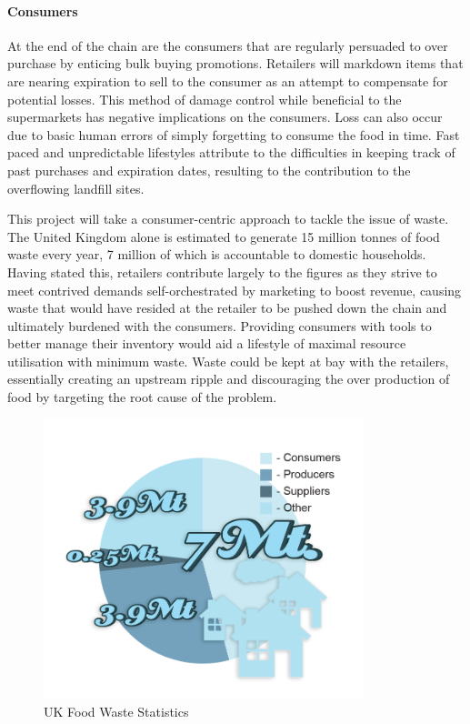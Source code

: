 \documentclass[a4paper, 11pt]{article}
\begin{document}
\paragraph{Consumers}At the end of the chain are the consumers that are regularly persuaded to over purchase by enticing bulk buying promotions. Retailers will markdown items that are nearing expiration to sell to the consumer as an attempt to compensate for potential losses. This method of damage control while beneficial to the supermarkets has negative implications on the consumers. Loss can also occur due to basic human errors of simply forgetting to consume the food in time. Fast paced and unpredictable lifestyles attribute to the difficulties in keeping track of past purchases and expiration dates, resulting to the contribution to the overflowing landfill sites.\cite{FoodWaste} 

\vspace{\baselineskip}
\vspace{\baselineskip}

This project will take a consumer-centric approach to tackle the issue of waste. The United Kingdom alone is estimated to generate 15 million tonnes of food waste every year, 7 million of which is accountable to domestic households.\cite{statistic} Having stated this, retailers contribute largely to the figures as they strive to meet contrived demands self-orchestrated by marketing to boost revenue, causing waste that would have resided at the retailer to be pushed down the chain and ultimately burdened with the consumers.\cite{waste} Providing consumers with tools to better manage their inventory would aid a lifestyle of maximal resource utilisation with minimum waste. Waste could be kept at bay with the retailers, essentially creating an upstream ripple and discouraging the over production of food by targeting the root cause of the problem.\vspace{\baselineskip}

\begin{figure}[h!]
  \centering
    \includegraphics[width=0.83\textwidth]{system7.png}
      \caption{UK Food Waste Statistics}
\end{figure}
\end{document}
